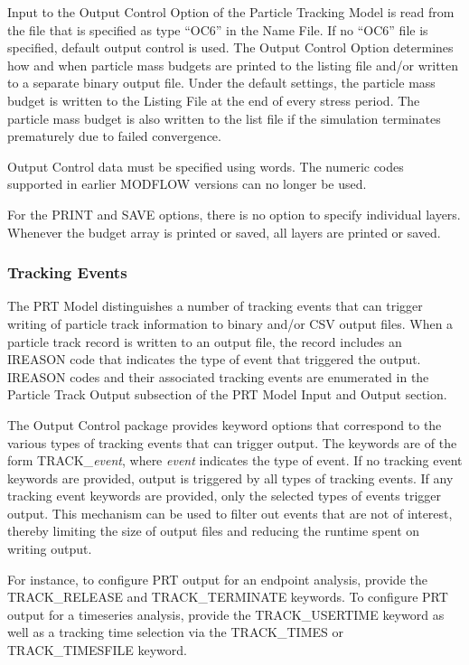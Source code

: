 Input to the Output Control Option of the Particle Tracking Model is read from the file that is specified as type ``OC6'' in the Name File. If no ``OC6'' file is specified, default output control is used. The Output Control Option determines how and when particle mass budgets are printed to the listing file and/or written to a separate binary output file.  Under the default settings, the particle mass budget is written to the Listing File at the end of every stress period.  The particle mass budget is also written to the list file if the simulation terminates prematurely due to failed convergence.

Output Control data must be specified using words.  The numeric codes supported in earlier MODFLOW versions can no longer be used.

For the PRINT and SAVE options, there is no option to specify individual layers.  Whenever the budget array is printed or saved, all layers are printed or saved.

\vspace{5mm}
\subsubsection{Tracking Events}

The PRT Model distinguishes a number of tracking events that can trigger writing of particle track information to binary and/or CSV output files. When a particle track record is written to an output file, the record includes an IREASON code that indicates the type of event that triggered the output. IREASON codes and their associated tracking events are enumerated in the Particle Track Output subsection of the PRT Model Input and Output section.
 
The Output Control package provides keyword options that correspond to the various types of tracking events that can trigger output. The keywords are of the form TRACK\_\textit{event}, where \textit{event} indicates the type of event. If no tracking event keywords are provided, output is triggered by all types of tracking events. If any tracking event keywords are provided, only the selected types of events trigger output. This mechanism can be used to filter out events that are not of interest, thereby limiting the size of output files and reducing the runtime spent on writing output.
 
For instance, to configure PRT output for an endpoint analysis, provide the TRACK\_RELEASE and TRACK\_TERMINATE keywords. To configure PRT output for a timeseries analysis, provide the TRACK\_USERTIME keyword as well as a tracking time selection via the TRACK\_TIMES or TRACK\_TIMESFILE keyword.

